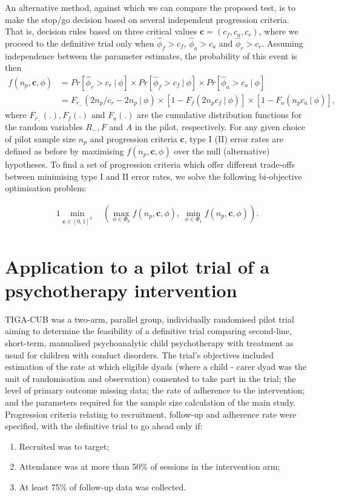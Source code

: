 \documentclass[AMA,STIX1COL]{WileyNJD-v2}
\begin{document}
An alternative method, against which we can compare the proposed test, is to make the stop/go decision based on several independent progression criteria. That is, decision rules based on three critical values $\mathbf{c} = (c_f, c_a, c_r)$, where we proceed to the definitive trial only when $\hat{\phi}_f > c_f$, $\hat{\phi}_a > c_a$ and $\hat{\phi}_r > c_r$. Assuming independence between the parameter estimates, the probability of this event is then
\begin{align*}
f(n_p, \mathbf{c}, \phi) &= Pr[\hat{\phi}_r > c_r ~ | ~ \phi] \times Pr[ \hat{\phi}_f > c_f ~ | ~ \phi] \times Pr[ \hat{\phi}_a > c_a ~ | ~ \phi] \\
&= F_{r_-}( 2n_p/c_r - 2n_p ~ | ~ \phi) \times [1-F_f(2n_p c_f ~ | ~ \phi)] \times [1-F_a(n_p c_a ~ | ~ \phi)],
\end{align*}
where $F_{r_-}(.), F_f(.)$ and $F_a(.)$ are the cumulative distribution functions for the random variables $R_-, F$ and $A$ in the pilot, respectively. For any given choice of pilot sample size $n_p$ and progression criteria $\mathbf{c}$, type I (II) error rates are defined as before by maximising $f(n_p, \mathbf{c}, \phi)$ over the null (alternative) hypotheses. To find a set of progression criteria which offer different trade-offs between minimising type I and II error rates, we solve the following bi-objective optimisation problem:

\begin{alignat*}{1}
\min_{\mathbf{c} \in [0,1]^3} ~ & \left( \max_{\phi \in \Phi_0} f(n_p, \mathbf{c}, \phi) , ~ \min_{\phi \in \Phi_1} f(n_p, \mathbf{c}, \phi) \right). \\
\end{alignat*}

\section{Application to a pilot trial of a psychotherapy intervention}

TIGA-CUB was a two-arm, parallel group, individually randomised pilot trial aiming to determine the feasibility of a definitive trial comparing second-line, short-term, manualised psychoanalytic child psychotherapy with treatment as usual for children with conduct disorders. The trial's objectives included estimation of the rate at which eligible dyads (where a child - carer dyad was the unit of randomisation and observation) consented to take part in the trial; the level of primary outcome missing data; the rate of adherence to the intervention; and the parameters required for the sample size calculation of the main study. Progression criteria relating to recruitment, follow-up and adherence rate were specified, with the definitive trial to go ahead only if:
\begin{enumerate}
\item Recruited was to target;
\item Attendance was at more than 50\% of sessions in the intervention arm;
\item At least 75\% of follow-up data was collected.
\end{enumerate}
\end{document}

